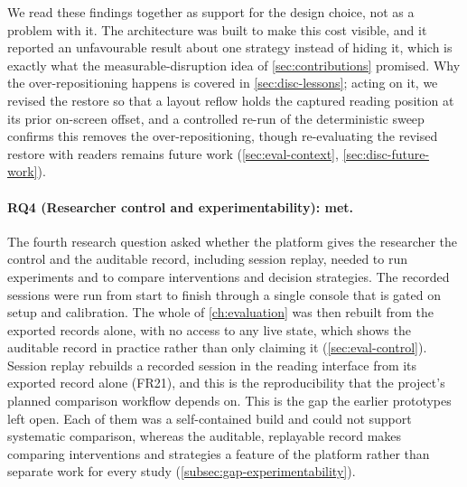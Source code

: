 We read these findings together as support for the design choice, not as a problem with it.
The architecture was built to make this cost visible, and it reported an unfavourable result about one strategy instead of hiding it, which is exactly what the measurable-disruption idea of \cref{sec:contributions} promised.
Why the over-repositioning happens is covered in \cref{sec:disc-lessons}; acting on it, we revised the restore so that a layout reflow holds the captured reading position at its prior on-screen offset, and a controlled re-run of the deterministic sweep confirms this removes the over-repositioning, though re-evaluating the revised restore with readers remains future work (\cref{sec:eval-context}, \cref{sec:disc-future-work}).

\paragraph{RQ4 (Researcher control and experimentability): met.}
The fourth research question asked whether the platform gives the researcher the control and the auditable record, including session replay, needed to run experiments and to compare interventions and decision strategies.
The recorded sessions were run from start to finish through a single console that is gated on setup and calibration.
The whole of \cref{ch:evaluation} was then rebuilt from the exported records alone, with no access to any live state, which shows the auditable record in practice rather than only claiming it (\cref{sec:eval-control}).
Session replay rebuilds a recorded session in the reading interface from its exported record alone (FR21), and this is the reproducibility that the project's planned comparison workflow depends on.
This is the gap the earlier prototypes left open.
Each of them was a self-contained build and could not support systematic comparison, whereas the auditable, replayable record makes comparing interventions and strategies a feature of the platform rather than separate work for every study (\cref{subsec:gap-experimentability}).

